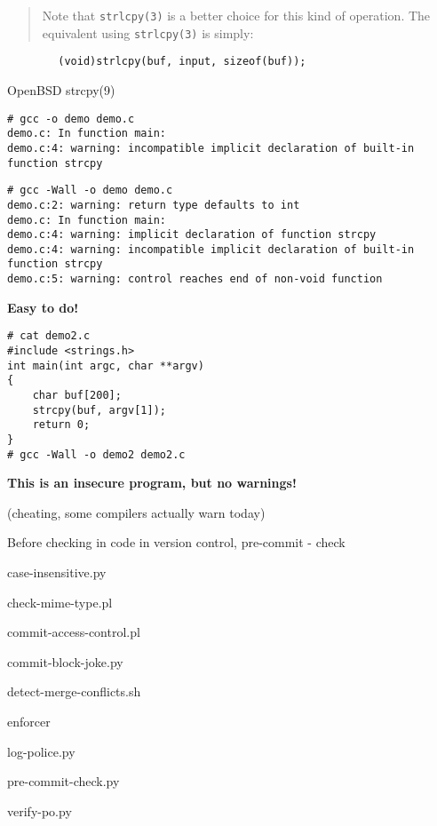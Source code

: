 \documentclass[Screen16to9,17pt]{foils}
\begin{document}
\begin{quote}
Note that \verb+strlcpy(3)+ is a better choice for this kind of operation.  The
equivalent using \verb+strlcpy(3)+ is simply:
\end{quote}
\begin{verbatim}
        (void)strlcpy(buf, input, sizeof(buf));
\end{verbatim}

OpenBSD strcpy(9)




\begin{verbatim}
# gcc -o demo demo.c
demo.c: In function main:
demo.c:4: warning: incompatible implicit declaration of built-in
function strcpy
\end{verbatim}

\begin{verbatim}
# gcc -Wall -o demo demo.c
demo.c:2: warning: return type defaults to int
demo.c: In function main:
demo.c:4: warning: implicit declaration of function strcpy
demo.c:4: warning: incompatible implicit declaration of built-in
function strcpy
demo.c:5: warning: control reaches end of non-void function
\end{verbatim}

\vskip 15mm
\centerline{\bf\LARGE\color{security6blue}Easy to do!}


\begin{verbatim}
# cat demo2.c
#include <strings.h>
int main(int argc, char **argv)
{
    char buf[200];
    strcpy(buf, argv[1]);
    return 0;
}
# gcc -Wall -o demo2 demo2.c
\end{verbatim}

\vskip 1cm
\centerline{\bf\large\color{security6blue}This is an insecure program, but no warnings!}

(cheating, some compilers actually warn today)


\begin{list1}
\item Before checking in code in version control,  pre-commit - check
\begin{list2}
\item case-insensitive.py
\item check-mime-type.pl
\item commit-access-control.pl
\item commit-block-joke.py
\item detect-merge-conflicts.sh
\item enforcer
\item log-police.py
\item pre-commit-check.py
\item verify-po.py
\end{list2}
\item {}
\item {}
\end{list1}
\end{document}

